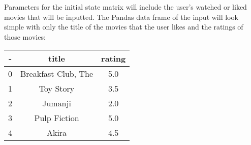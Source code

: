 \documentclass{article}
\begin{document}
Parameters for the initial state matrix will include the user's watched or liked movies that will be inputted. The Pandas data frame of the input
will look simple with only the title of the movies that the user likes and the ratings of those movies:
\begin{center}
\begin{tabular}{||c c c||}
    \hline
    - & title & rating \\ [0.5ex] 
    \hline\hline
    0 & Breakfast Club, The & 5.0 \\ 
    \hline
    1 & Toy Story & 3.5 \\
    \hline
    2 & Jumanji & 2.0 \\
    \hline
    3 & Pulp Fiction & 5.0 \\
    \hline
    4 & Akira & 4.5 \\ [1ex] 
    \hline
\end{tabular}
\end{center}
\end{document}
